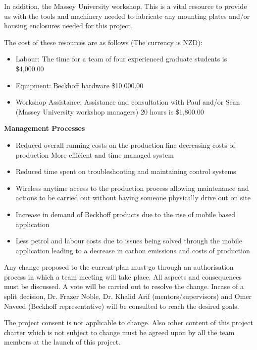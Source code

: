 \documentclass[a4paper, 10pt, conference]{IEEEconf}
\begin{document}
In addition, the Massey University workshop. This is a vital resource to provide us with the tools and machinery needed to fabricate any mounting plates and/or housing enclosures needed for this project.

The cost of these resources are as follows (The currency is NZD):
\begin{itemize}
	\item Labour: The time for a team of four experienced graduate students is \$4,000.00
	\item Equipment: Beckhoff hardware \$10,000.00
	\item Workshop Assistance: Assistance and consultation with Paul and/or Sean (Massey University workshop managers) 20 hours is \$1,800.00
\end{itemize}	

{\bf Management Processes}

\begin{itemize}
	\item Reduced overall running costs on the production line decreasing costs of production
More efficient and time managed system
	\item Reduced time spent on troubleshooting and maintaining control systems
	\item Wireless anytime access to the production process allowing maintenance and actions to be carried out without having someone physically drive out on site
	\item Increase in demand of Beckhoff products due to the rise of mobile based application
	\item Less petrol and labour costs due to issues being solved through the mobile application leading to a decrease in carbon emissions and costs of production
\end{itemize}	

Any change proposed to the current plan must go through an authorisation process in which a team meeting will take place. All aspects and consequences must be discussed. A vote will be carried out to resolve the change. Incase of a split decision, Dr. Frazer Noble, Dr. Khalid Arif (mentors/supervisors) and Omer Naveed (Beckhoff representative) will be consulted to reach the desired goals.

The project consent is not applicable to change. Also other content of this project charter which is not subject to change must be agreed upon by all the team members at the launch of this project. 
\end{document}
